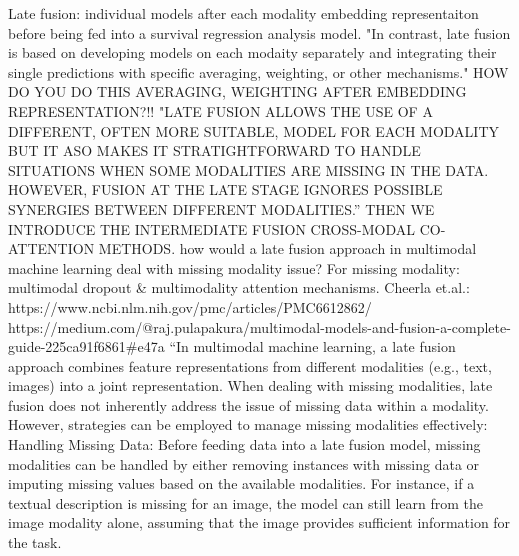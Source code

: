 \documentclass{article}%
\begin{document}
\newline%
%
Late fusion: individual models after each modality embedding representaiton before being fed into a survival regression analysis model. "In contrast, late fusion is based on developing models on each modaity separately and integrating their single predictions with specific averaging, weighting, or other mechanisms." HOW DO YOU DO THIS AVERAGING, WEIGHTING AFTER EMBEDDING REPRESENTATION?!! "LATE FUSION ALLOWS THE USE OF A DIFFERENT, OFTEN MORE SUITABLE, MODEL FOR EACH MODALITY BUT IT ASO MAKES IT STRATIGHTFORWARD TO HANDLE SITUATIONS WHEN SOME MODALITIES ARE MISSING IN THE DATA. HOWEVER, FUSION AT THE LATE STAGE IGNORES POSSIBLE SYNERGIES BETWEEN DIFFERENT MODALITIES.”%
\newline%
\newline%
%
THEN WE INTRODUCE THE INTERMEDIATE FUSION CROSS{-}MODAL CO{-}ATTENTION METHODS. %
\newline%
\newline%
%
how would a late fusion approach in multimodal machine learning deal with missing modality issue? %
\newline%
\newline%
%
For missing modality:%
\newline%
\newline%
%
multimodal dropout \& multimodality attention mechanisms. %
\newline%
\newline%
%
Cheerla et.al.: https://www.ncbi.nlm.nih.gov/pmc/articles/PMC6612862/ %
\newline%
\newline%
%
https://medium.com/@raj.pulapakura/multimodal{-}models{-}and{-}fusion{-}a{-}complete{-}guide{-}225ca91f6861\#e47a%
\newline%
\newline%
%
%
\newline%
\newline%
%
“In multimodal machine learning, a late fusion approach combines feature representations from different modalities (e.g., text, images) into a joint representation. When dealing with missing modalities, late fusion does not inherently address the issue of missing data within a modality. However, strategies can be employed to manage missing modalities effectively:%
\newline%
\newline%
%
Handling Missing Data: Before feeding data into a late fusion model, missing modalities can be handled by either removing instances with missing data or imputing missing values based on the available modalities. For instance, if a textual description is missing for an image, the model can still learn from the image modality alone, assuming that the image provides sufficient information for the task.%
\end{document}
